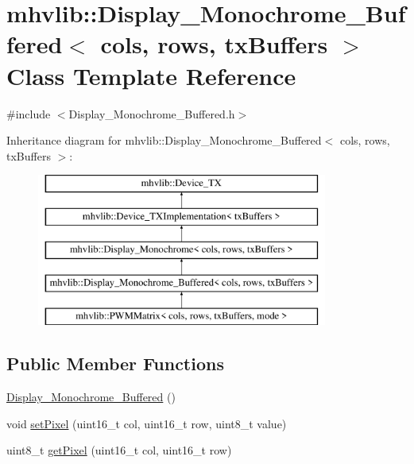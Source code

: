 \hypertarget{classmhvlib_1_1_display___monochrome___buffered}{\section{mhvlib\-:\-:Display\-\_\-\-Monochrome\-\_\-\-Buffered$<$ cols, rows, tx\-Buffers $>$ Class Template Reference}
\label{classmhvlib_1_1_display___monochrome___buffered}
}


{\ttfamily \#include $<$Display\-\_\-\-Monochrome\-\_\-\-Buffered.\-h$>$}

Inheritance diagram for mhvlib\-:\-:Display\-\_\-\-Monochrome\-\_\-\-Buffered$<$ cols, rows, tx\-Buffers $>$\-:\begin{figure}[H]
\begin{center}
\leavevmode
\includegraphics[height=5.000000cm]{classmhvlib_1_1_display___monochrome___buffered}
\end{center}
\end{figure}
\subsection*{Public Member Functions}
\begin{DoxyCompactItemize}
\item 
\hyperlink{classmhvlib_1_1_display___monochrome___buffered_abdba70da61885732d695ac70f737f6e5}{Display\-\_\-\-Monochrome\-\_\-\-Buffered} ()
\item 
void \hyperlink{classmhvlib_1_1_display___monochrome___buffered_a3c0d5145b5f4a60997d5cedfbb904ed8}{set\-Pixel} (uint16\-\_\-t col, uint16\-\_\-t row, uint8\-\_\-t value)
\item 
uint8\-\_\-t \hyperlink{classmhvlib_1_1_display___monochrome___buffered_a6748d5aeb91a19372155f4e6c9ae5f43}{get\-Pixel} (uint16\-\_\-t col, uint16\-\_\-t row)
\end{DoxyCompactItemize}
